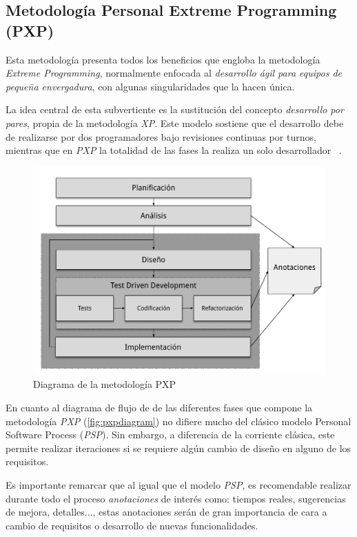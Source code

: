 \subsection{Metodología Personal Extreme Programming (PXP)} %

Esta metodología presenta todos los beneficios que engloba la metodología \textit{Extreme Programming}, normalmente enfocada al \textit{desarrollo ágil para equipos de pequeña envergadura}, con algunas
singularidades que la hacen única.

La idea central de esta subvertiente es la sustitución del concepto \textit{desarrollo por pares}, propia de la metodología \textit{XP}. Este modelo sostiene
que el desarrollo debe de realizarse por dos programadores bajo revisiones continuas por turnos, mientras que en \textit{PXP} la totalidad de las
fases la realiza un solo desarrollador ~\cite{inproceedings}.

\begin{figure}[H]
   \centering
   \includegraphics[scale=0.43]{images/pxpdiagram.pdf}
   \caption{Diagrama de la metodología PXP}
   \label{fig:pxpdiagram}
 \end{figure}

 En cuanto al diagrama de flujo de de las diferentes fases que compone
 la metodología \textit{PXP} (\autoref{fig:pxpdiagram}) no difiere mucho del clásico modelo 
 Personal Software Process (\textit{PSP}). Sin embargo, a diferencia de la corriente clásica, este permite realizar iteraciones
 si se requiere algún cambio de diseño en alguno de los requisitos.
 
 Es importante remarcar que al igual que el modelo \textit{PSP}, es recomendable realizar
 durante todo el proceso \textit{anotaciones} de interés como: tiempos reales,
 sugerencias de mejora, detalles..., estas anotaciones serán de gran importancia de cara
 a cambio de requisitos o desarrollo de nuevas funcionalidades.


